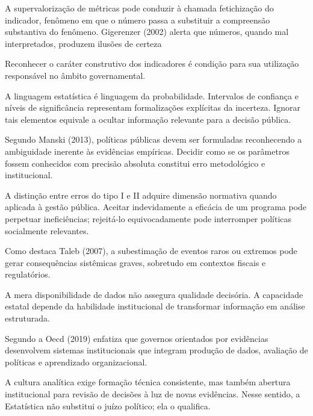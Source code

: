 A supervalorização de métricas pode conduzir à chamada fetichização do indicador, fenômeno em que o número passa a substituir a compreensão substantiva do fenômeno. Gigerenzer (2002) alerta que números, quando mal interpretados, produzem ilusões de certeza \vskip0.3cm

Reconhecer o caráter construtivo dos indicadores é condição para sua utilização responsável no âmbito governamental. \vskip0.3cm


A linguagem estatística é linguagem da probabilidade. Intervalos de confiança e níveis de significância representam formalizações explícitas da incerteza. Ignorar tais elementos equivale a ocultar informação relevante para a decisão pública. \vskip0.3cm

Segundo Manski (2013), políticas públicas devem ser formuladas reconhecendo a ambiguidade inerente às evidências empíricas. Decidir como se os parâmetros fossem conhecidos com precisão absoluta constitui erro metodológico e institucional. \vskip0.3cm

A distinção entre erros do tipo I e II adquire dimensão normativa quando aplicada à gestão pública. Aceitar indevidamente a eficácia de um programa pode perpetuar ineficiências; rejeitá-lo equivocadamente pode interromper políticas socialmente relevantes. \vskip0.3cm

Como destaca Taleb (2007), a subestimação de eventos raros ou extremos pode gerar consequências sistêmicas graves, sobretudo em contextos fiscais e regulatórios. \vskip0.3cm


A mera disponibilidade de dados não assegura qualidade decisória. A capacidade estatal depende da habilidade institucional de transformar informação em análise estruturada. \vskip0.3cm

Segundo a Oecd (2019) enfatiza que governos orientados por evidências desenvolvem sistemas institucionais que integram produção de dados, avaliação de políticas e aprendizado organizacional. \vskip0.3cm

A cultura analítica exige formação técnica consistente, mas também abertura institucional para revisão de decisões à luz de novas evidências. Nesse sentido, a Estatística não substitui o juízo político; ela o qualifica. \vskip0.3cm

